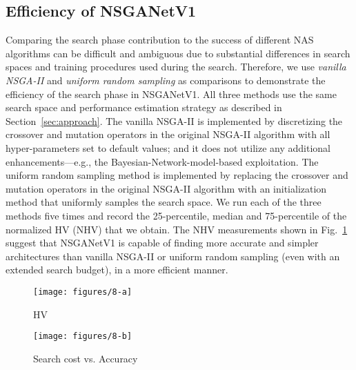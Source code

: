 \documentclass[journal]{IEEEtran}
\def\ourmethod{NSGANetV1}
\theoremstyle{definition}
\theoremstyle{remark}
\begin{document}
\subsection{Efficiency of \ourmethod{}\label{sec:efficiency}}
Comparing the search phase contribution to the success of different NAS algorithms can be difficult and ambiguous due to substantial differences in search spaces and training procedures used during the search. Therefore, we use \emph{vanilla NSGA-II} and \emph{uniform random sampling} as comparisons to demonstrate the efficiency of the search phase in \ourmethod{}. All three methods use the same search space and performance estimation strategy as described in Section~\ref{sec:approach}. The vanilla NSGA-II is implemented by discretizing the crossover and mutation operators in the original NSGA-II \cite{deb2002fast} algorithm with all hyper-parameters set to default values; and it does not utilize any additional enhancements---e.g., the Bayesian-Network-model-based exploitation. The uniform random sampling method is implemented by replacing the crossover and mutation operators in the original NSGA-II algorithm with an initialization method that uniformly samples the search space. We run each of the three methods five times and record the 25-percentile, median and 75-percentile of the normalized HV (NHV) that we obtain. The NHV measurements shown in Fig.~\ref{fig:nsganet_hv} suggest that \ourmethod{} is capable of finding more accurate and simpler architectures than vanilla NSGA-II or uniform random sampling (even with an extended search budget), in a more efficient manner.

\begin{figure*}[t]
	\centering
	\begin{subfigure}[t]{.48\textwidth}
		\centering
		\texttt{[image: figures/8-a]}
		\caption{HV \label{fig:nsganet_hv}}
	\end{subfigure} \hfill
	\begin{subfigure}[t]{.48\textwidth}
		\centering
		\texttt{[image: figures/8-b]}
		\caption{Search cost vs. Accuracy\label{fig:nsganet_search_cost}}
	\end{subfigure}
	\caption{Search efficiency comparison between \ourmethod{} and other baselines in terms of (a) HV, and (b) the required compute time in GPU-Days. The search cost is measured on CIFAR-10 for most methods, except \ourmethod{} and Block-QNN \cite{zhong2017blockqnn}, where the CIFAR-100 dataset is used for.
	\label{fig:search_efficiency}}
	\vspace{-1em}
\end{figure*}
\end{document}
